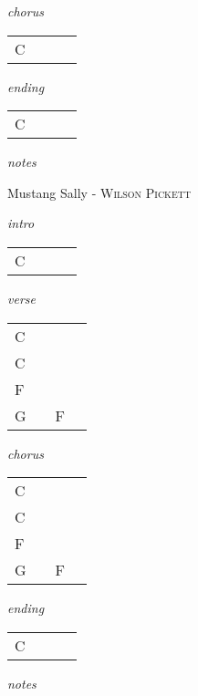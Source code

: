 \documentclass[12pt]{article}
\begin{document}
\textit{chorus}

\begin{tabular}{|P{1.25in}|P{1.25in}|P{1.25in}|P{1.25in}|}
  C &   &   &   \\
\end{tabular}

\textit{ending}

\begin{tabular}{|P{1.25in}|P{1.25in}|P{1.25in}|P{1.25in}|}
  C &   &   &   \\
\end{tabular}

\textit{notes}

\newpage

{\Huge Mustang Sally} {\huge - \textsc{Wilson Pickett}}

\huge
\textit{intro}

\begin{tabular}{|P{1.25in}|P{1.25in}|P{1.25in}|P{1.25in}|}
  C &   &   &   \\

\end{tabular}

\textit{verse}

\begin{tabular}{|P{1.25in}|P{1.25in}|P{1.25in}|P{1.25in}|}
  C &   &   &   \\
  C &   &   &   \\
  F &   &   &   \\
  G &   & F  &   \\
\end{tabular}

\textit{chorus}

\begin{tabular}{|P{1.25in}|P{1.25in}|P{1.25in}|P{1.25in}|}
  C &   &   &   \\
  C &   &   &   \\
  F &   &   &   \\
  G &   & F  &   \\
\end{tabular}

\textit{ending}

\begin{tabular}{|P{1.25in}|P{1.25in}|P{1.25in}|P{1.25in}|}
  C &   &   &   \\
\end{tabular}

\textit{notes}

\newpage
\end{document}
